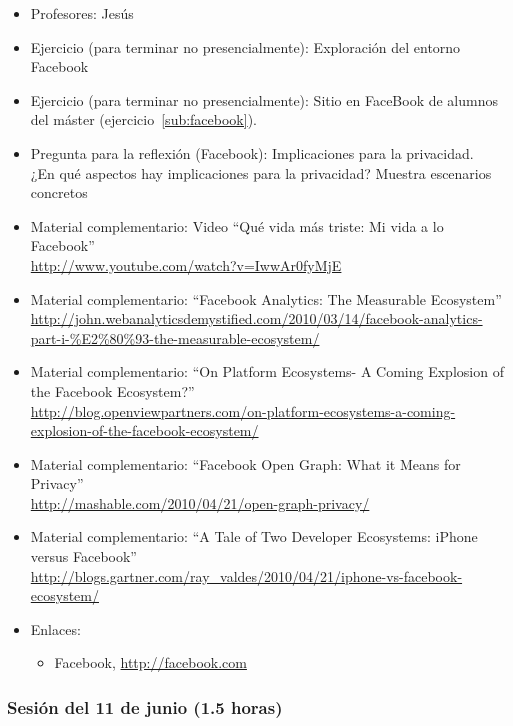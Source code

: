 \documentclass[a4paper,12pt]{article}
\begin{document}
\begin{itemize}
\item Profesores: Jesús
\item Ejercicio (para terminar no presencialmente): Exploración del entorno Facebook
\item Ejercicio (para terminar no presencialmente): Sitio en FaceBook de alumnos del máster (ejercicio~\ref{sub:facebook}).

\item Pregunta para la reflexión (Facebook): Implicaciones para la privacidad. \\
  ¿En qué aspectos hay implicaciones para la privacidad? Muestra escenarios concretos

\item Material complementario: Video ``Qué vida más triste: Mi vida a lo Facebook'' \\
\url{http://www.youtube.com/watch?v=IwwAr0fyMjE}
\item Material complementario: ``Facebook Analytics: The Measurable Ecosystem'' \\
  \url{http://john.webanalyticsdemystified.com/2010/03/14/facebook-analytics-part-i-%E2%80%93-the-measurable-ecosystem/}
\item Material complementario: ``On Platform Ecosystems- A Coming Explosion of the Facebook Ecosystem?''\\
  \url{http://blog.openviewpartners.com/on-platform-ecosystems-a-coming-explosion-of-the-facebook-ecosystem/}
\item Material complementario: ``Facebook Open Graph: What it Means for Privacy'' \\
  \url{http://mashable.com/2010/04/21/open-graph-privacy/}
\item Material complementario: ``A Tale of Two Developer Ecosystems: iPhone versus Facebook'' \\
  \url{http://blogs.gartner.com/ray_valdes/2010/04/21/iphone-vs-facebook-ecosystem/}
\item Enlaces:
  \begin{itemize}
  \item Facebook, \url{http://facebook.com}
  \end{itemize}
\end{itemize}


\subsubsection{Sesión del 11 de junio (1.5 horas)}
\end{document}
